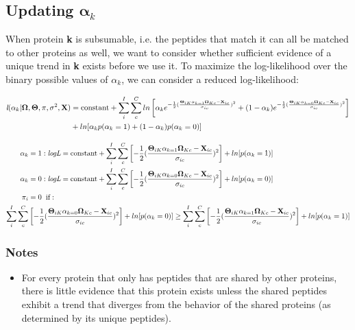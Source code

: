 \documentclass[12pt]{article}
\begin{document}
\subsection*{Updating $\mathbf{\alpha}_{k}$}

When protein \textbf{k} is subsumable, i.e. the peptides that match it can all be matched to other proteins as well, we want to consider whether sufficient evidence of a unique trend in \textbf{k} exists before we use it.  To maximize the log-likelihood over the binary possible values of $\alpha_{k}$, we can consider a reduced log-likelihood:

\begin{align}
\textit{l}(\alpha_{k} | \mathbf{\Omega}, \mathbf{\Theta}, \pi, \sigma^{2}, \textbf{X}) &= \text{constant} + \sum_{i}^{I}\sum_{c}^{C}ln\left[\alpha_{k}e^{-\frac{1}{2}(\frac{\mathbf{\Theta}_{iK}\alpha_{k  = 1}\mathbf{\Omega}_{Kc} - \textbf{X}_{ic}}{\sigma_{ic}})^2} + (1-\alpha_{k})e^{-\frac{1}{2}(\frac{\mathbf{\Theta}_{iK}\alpha_{k  = 0}\mathbf{\Omega}_{Kc} - \textbf{X}_{ic}}{\sigma_{ic}})^2}\right]\notag\\
&+ ln[\alpha_{k}p(\alpha_{k} = 1) + (1-\alpha_{k})p(\alpha_{k} = 0)]\notag
\end{align}

\begin{align}
\alpha_{k} &= 1: \textit{logL} = \text{constant} + \sum_{i}^{I}\sum_{c}^{C}\left[{-\frac{1}{2}(\frac{\mathbf{\Theta}_{iK}\alpha_{k  = 1}\mathbf{\Omega}_{Kc} - \textbf{X}_{ic}}{\sigma_{ic}})^2}\right] + ln[p(\alpha_{k} = 1)]\notag\\
\alpha_{k} &= 0: \textit{logL} = \text{constant} + \sum_{i}^{I}\sum_{c}^{C}\left[{-\frac{1}{2}(\frac{\mathbf{\Theta}_{iK}\alpha_{k  = 0}\mathbf{\Omega}_{Kc} - \textbf{X}_{ic}}{\sigma_{ic}})^2}\right] + ln[p(\alpha_{k} = 0)]\notag\\
\pi_{i} &= 0 \hspace{2mm}\text{if}:\notag\\ \sum_{i}^{I}\sum_{c}^{C}&\left[{-\frac{1}{2}(\frac{\mathbf{\Theta}_{iK}\alpha_{k  = 0}\mathbf{\Omega}_{Kc} - \textbf{X}_{ic}}{\sigma_{ic}})^2}\right] + ln[p(\alpha_{k} = 0)] \ge \sum_{i}^{I}\sum_{c}^{C}\left[{-\frac{1}{2}(\frac{\mathbf{\Theta}_{iK}\alpha_{k  = 1}\mathbf{\Omega}_{Kc} - \textbf{X}_{ic}}{\sigma_{ic}})^2}\right] + ln[p(\alpha_{k} = 1)]
\end{align}

\subsubsection*{Notes}

\begin{itemize}
\item For every protein that only has peptides that are shared by other proteins, there is little evidence that this protein exists unless the shared peptides exhibit a trend that diverges from the behavior of the shared proteins (as determined by its unique peptides).  
\end{itemize}
\end{document}

